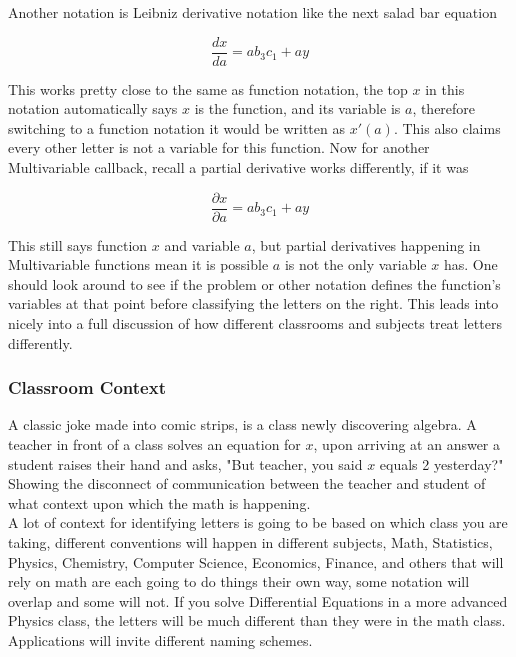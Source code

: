 \documentclass[12pt]{article}
\begin{document}
Another notation is Leibniz derivative notation like the next salad bar equation  

\begin{equation*}
    \frac{dx}{da}= ab_3c_1+ay
\end{equation*}

This works pretty close to the same as function notation, the top $x$ in this notation automatically says $x$ is the function, and its variable is $a$, therefore switching to a function notation it would be written as $x'(a)$. This also claims every other letter is not a variable for this function. Now for another Multivariable callback, recall a partial derivative works differently, if it was

\begin{equation*}
    \frac{\partial x}{\partial a}= ab_3c_1+ay
\end{equation*}

This still says function $x$ and variable $a$, but partial derivatives happening in Multivariable functions mean it is possible $a$ is not the only variable $x$ has. One should look around to see if the problem or other notation defines the function's variables at that point before classifying the letters on the right. This leads into nicely into a full discussion of how different classrooms and subjects treat letters differently.

\subsubsection{Classroom Context}

A classic joke made into comic strips, is a class newly discovering algebra. A teacher in front of a class solves an equation for $x$, upon arriving at an answer a student raises their hand and asks, "But teacher, you said $x$ equals 2 yesterday?" Showing the disconnect of communication between the teacher and student of what context upon which the math is happening. \\

A lot of context for identifying letters is going to be based on which class you are taking, different conventions will happen in different subjects, Math, Statistics, Physics, Chemistry, Computer Science, Economics, Finance, and others that will rely on math are each going to do things their own way, some notation will overlap and some will not. If you solve Differential Equations in a more advanced Physics class, the letters will be much different than they were in the math class. Applications will invite different naming schemes. \\
\end{document}
